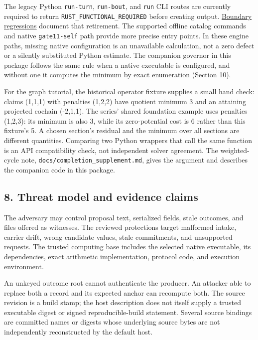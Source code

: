 \documentclass[
  11pt,
]{article}
\newcommand{\passthrough}[1]{#1}
\begin{document}
The legacy Python \passthrough{\lstinline!run-turn!},
\passthrough{\lstinline!run-bout!}, and \passthrough{\lstinline!run!}
CLI routes are currently required to return
\nolinkurl{RUST_FUNCTIONAL_REQUIRED} before creating output.
\href{https://github.com/dbccpage/the_symbol_game/blob/52cb5457f6c485ba548cfd292f6012a941ed22cf/omega_engine_pfp/tests/test_functional_boundary.py}{Boundary
regressions} document that retirement. The supported offline catalog
commands and native \passthrough{\lstinline!gate11-self!} path provide
more precise entry points. In these engine paths, missing native
configuration is an unavailable calculation, not a zero defect or a
silently substituted Python estimate. The companion governor in this
package follows the same rule when a native executable is configured,
and without one it computes the minimum by exact enumeration (Section
10).

For the graph tutorial, the historical operator fixture supplies a small
hand check: claims (1,1,1) with penalties (1,2,2) have quotient minimum
3 and an attaining projected cochain (-2,1,1). The series' shared
foundation example uses penalties (1,2,3): its minimum is also 3, while
its zero-potential cost is 6 rather than this fixture's 5. A chosen
section's residual and the minimum over all sections are different
quantities. Comparing two Python wrappers that call the same function is
an API compatibility check, not independent solver agreement. The
weighted-cycle note, \nolinkurl{docs/completion_supplement.md}, gives
the argument and describes the companion code in this package.

\subsection{8. Threat model and evidence
claims}\label{threat-model-and-evidence-claims}

The adversary may control proposal text, serialized fields, stale
outcomes, and files offered as witnesses. The reviewed protections
target malformed intake, carrier drift, wrong candidate values, stale
commitments, and unsupported requests. The trusted computing base
includes the selected native executable, its dependencies, exact
arithmetic implementation, protocol code, and execution environment.

An unkeyed outcome root cannot authenticate the producer. An attacker
able to replace both a record and its expected anchor can recompute
both. The source revision is a build stamp; the host description does
not itself supply a trusted executable digest or signed
reproducible-build statement. Several source bindings are committed
names or digests whose underlying source bytes are not independently
reconstructed by the default host.
\end{document}
